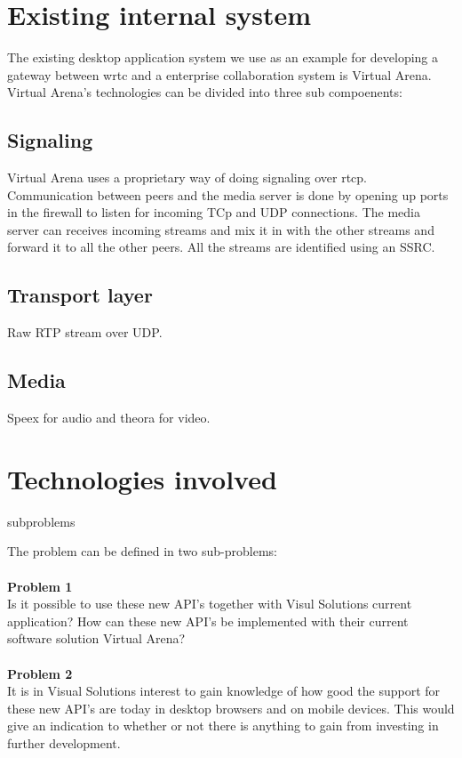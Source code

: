 \section{Existing internal system}
The existing desktop application system we use as an example for developing a gateway between \gls{wrtc} and a enterprise collaboration system is Virtual Arena. Virtual Arena's technologies can be divided into three sub compoenents:

\subsection{Signaling}
Virtual Arena uses a proprietary way of doing signaling over \gls{rtcp}. Communication between peers and the media server is done by opening up ports in the firewall to listen for incoming TCp and UDP connections. The media server can receives incoming streams and mix it in with the other streams and forward it to all the other peers. All the streams are identified using an SSRC.

\subsection{Transport layer}
Raw RTP stream over UDP.

\subsection{Media}
Speex for audio and theora for video.


\section{Technologies involved}
subproblems


The problem can be defined in two sub-problems:
\\
\\
\textbf{Problem 1}\\
Is it possible to use these new API's together with Visul Solutions current application? How can these new API's be implemented with their current software solution Virtual Arena?
\\
\\
\textbf{Problem 2}\\
It is in Visual Solutions interest to gain knowledge of how good the support for these new API's are today in desktop browsers and on mobile devices. This would give an indication to whether or not there is anything to gain from investing in further development.